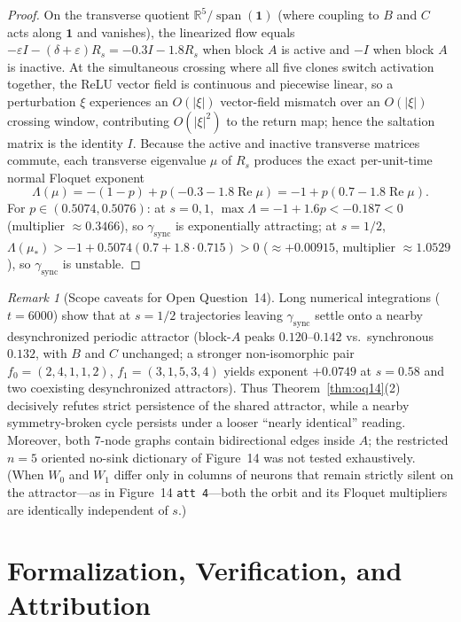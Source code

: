 \documentclass[11pt]{article}
\theoremstyle{plain}
\theoremstyle{definition}
\theoremstyle{remark}
\newtheorem{remark}{Remark}
\DeclareMathOperator{\spn}{span}
\begin{document}
\begin{proof}
On the transverse quotient $\mathbb{R}^5 / \spn(\mathbf{1})$ (where coupling to $B$ and $C$ acts along $\mathbf{1}$ and vanishes), the linearized flow equals $-\varepsilon I - (\delta + \varepsilon)R_s = -0.3 I - 1.8 R_s$ when block $A$ is active and $-I$ when block $A$ is inactive. At the simultaneous crossing where all five clones switch activation together, the ReLU vector field is continuous and piecewise linear, so a perturbation $\xi$ experiences an $O(|\xi|)$ vector-field mismatch over an $O(|\xi|)$ crossing window, contributing $O(|\xi|^2)$ to the return map; hence the saltation matrix is the identity $I$. Because the active and inactive transverse matrices commute, each transverse eigenvalue $\mu$ of $R_s$ produces the exact per-unit-time normal Floquet exponent
\[
\Lambda(\mu) = -(1 - p) + p(-0.3 - 1.8\operatorname{Re}\mu) = -1 + p(0.7 - 1.8\operatorname{Re}\mu).
\]
For $p \in (0.5074, 0.5076)$: at $s = 0, 1$, $\max \Lambda = -1 + 1.6p < -0.187 < 0$ (multiplier $\approx 0.3466$), so $\gamma_{\mathrm{sync}}$ is exponentially attracting; at $s = 1/2$, $\Lambda(\mu_*) > -1 + 0.5074(0.7 + 1.8 \cdot 0.715) > 0$ ($\approx +0.00915$, multiplier $\approx 1.0529$), so $\gamma_{\mathrm{sync}}$ is unstable.
\end{proof}

\begin{remark}[Scope caveats for Open Question~14]
Long numerical integrations ($t = 6000$) show that at $s = 1/2$ trajectories leaving $\gamma_{\mathrm{sync}}$ settle onto a nearby desynchronized periodic attractor (block-$A$ peaks $0.120$--$0.142$ vs.\ synchronous $0.132$, with $B$ and $C$ unchanged; a stronger non-isomorphic pair $f_0 = (2,4,1,1,2)$, $f_1 = (3,1,5,3,4)$ yields exponent $+0.0749$ at $s = 0.58$ and two coexisting desynchronized attractors). Thus Theorem~\ref{thm:oq14}(2) decisively refutes strict persistence of the shared attractor, while a nearby symmetry-broken cycle persists under a looser ``nearly identical'' reading. Moreover, both 7-node graphs contain bidirectional edges inside $A$; the restricted $n = 5$ oriented no-sink dictionary of Figure~14 was not tested exhaustively. (When $W_0$ and $W_1$ differ only in columns of neurons that remain strictly silent on the attractor---as in Figure~14 \texttt{att~4}---both the orbit and its Floquet multipliers are identically independent of $s$.)
\end{remark}

\section{Formalization, Verification, and Attribution}
\end{document}
